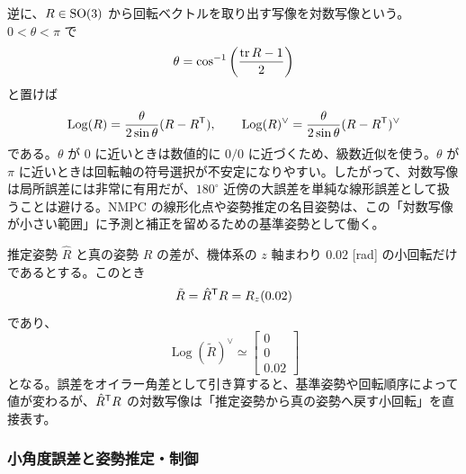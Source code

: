 逆に、$R\in\operatorname{SO}(3)$ から回転ベクトルを取り出す写像を対数写像という。$0<\theta<\pi$ で
\begin{equation}
  \theta=
  \cos^{-1}\left(\frac{\operatorname{tr} R-1}{2}\right)
\end{equation}
と置けば
\begin{equation}
  \operatorname{Log}(R)
  =
  \frac{\theta}{2\sin\theta}(R-R^{\mathsf{T}}),
  \qquad
  \operatorname{Log}(R)^\vee
  =
  \frac{\theta}{2\sin\theta}(R-R^{\mathsf{T}})^\vee
\end{equation}
である。$\theta$ が 0 に近いときは数値的に $0/0$ に近づくため、級数近似を使う。$\theta$ が $\pi$ に近いときは回転軸の符号選択が不安定になりやすい。したがって、対数写像は局所誤差には非常に有用だが、$180^\circ$ 近傍の大誤差を単純な線形誤差として扱うことは避ける。NMPC の線形化点や姿勢推定の名目姿勢は、この「対数写像が小さい範囲」に予測と補正を留めるための基準姿勢として働く。

\begin{example}[小さな姿勢誤差の対数写像]
推定姿勢 $\hat{R}$ と真の姿勢 $R$ の差が、機体系の $z$ 軸まわり $0.02$ [rad] の小回転だけであるとする。このとき
\begin{equation}
  \tilde{R}=\hat{R}^{\mathsf{T}} R=R_z(0.02)
\end{equation}
であり、
\begin{equation}
  \operatorname{Log}(\tilde{R})^\vee
  \simeq
  \begin{bmatrix}
    0\\0\\0.02
  \end{bmatrix}
\end{equation}
となる。誤差をオイラー角差として引き算すると、基準姿勢や回転順序によって値が変わるが、$\hat{R}^{\mathsf{T}} R$ の対数写像は「推定姿勢から真の姿勢へ戻す小回転」を直接表す。
\end{example}

\subsubsection{小角度誤差と姿勢推定・制御}

